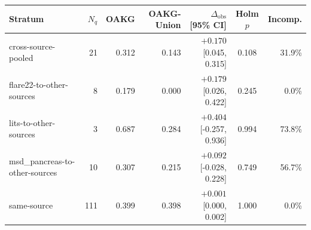 \begin{tabular}{lrrrrcr}
\toprule
Stratum & $N_q$ & OAKG & OAKG-Union & $\Delta_{\mathrm{obs}}$ [95\% CI] & Holm $p$ & Incomp. \\
\midrule
cross-source-pooled & 21 & 0.312 & 0.143 & $+0.170$ [0.045, 0.315] & 0.108 & 31.9\% \\
flare22-to-other-sources & 8 & 0.179 & 0.000 & $+0.179$ [0.026, 0.422] & 0.245 & 0.0\% \\
lits-to-other-sources & 3 & 0.687 & 0.284 & $+0.404$ [-0.257, 0.936] & 0.994 & 73.8\% \\
msd\_pancreas-to-other-sources & 10 & 0.307 & 0.215 & $+0.092$ [-0.028, 0.228] & 0.749 & 56.7\% \\
same-source & 111 & 0.399 & 0.398 & $+0.001$ [0.000, 0.002] & 1.000 & 0.0\% \\
\bottomrule
\end{tabular}
